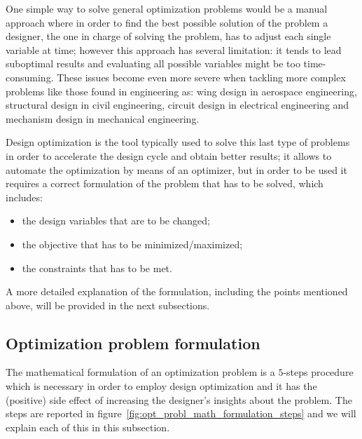 One simple way to solve general optimization problems would be a manual approach where in order to find the best possible solution of the problem a designer, the one in charge of solving the problem, has to adjust each single variable at time; however this approach has several limitation: it tends to lead suboptimal results and evaluating all possible variables might be too time-consuming. These issues become even more severe when tackling more complex problems like those found in engineering as: wing design in aerospace engineering, structural design in civil engineering, circuit design in electrical engineering and mechanism design in mechanical engineering.

Design optimization is the tool typically used to solve this last type of problems in order to accelerate the design cycle and obtain better results; it allows to automate the optimization by means of an optimizer, but in order to be used it requires a correct formulation of the problem that has to be solved, which includes:
\begin{itemize}
	\item the design variables that are to be changed;
	\item the objective that has to be minimized/maximized;
	\item the constraints that has to be met.
\end{itemize}
A more detailed explanation of the formulation, including the points mentioned above, will be provided in the next subsections.



\subsection{Optimization problem formulation}

The mathematical formulation of an optimization problem is a $5$-steps procedure which is necessary in order to employ design optimization and it has the (positive) side effect of increasing the designer's insights about the problem. The steps are reported in figure~\ref{fig:opt_probl_math_formulation_steps} and we will explain each of this in this subsection.

